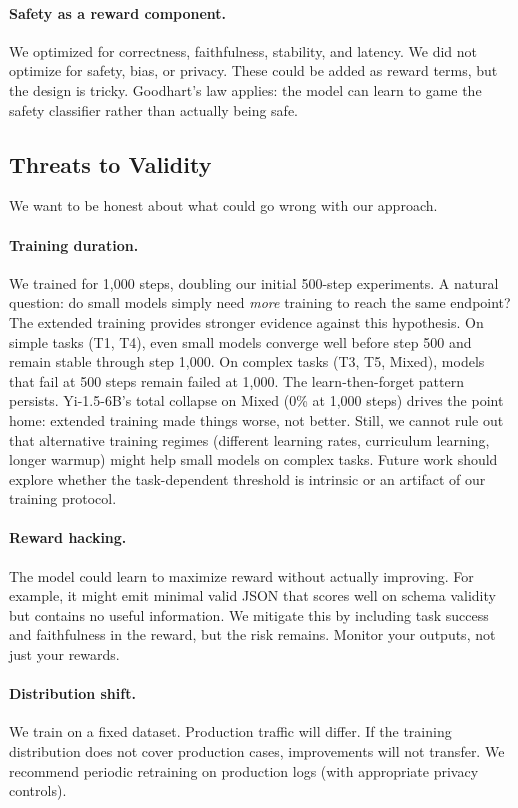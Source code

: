 \documentclass[11pt]{article}
\begin{document}
\paragraph{Safety as a reward component.}
We optimized for correctness, faithfulness, stability, and latency.
We did not optimize for safety, bias, or privacy.
These could be added as reward terms, but the design is tricky.  Goodhart's law applies: the model can learn to game the safety classifier rather than actually being safe.

\subsection{Threats to Validity}

We want to be honest about what could go wrong with our approach.

\paragraph{Training duration.}
We trained for 1{,}000 steps, doubling our initial 500-step experiments.
A natural question: do small models simply need \emph{more} training to reach the same endpoint?
The extended training provides stronger evidence against this hypothesis.
On simple tasks (T1, T4), even small models converge well before step 500 and remain stable through step 1{,}000.
On complex tasks (T3, T5, Mixed), models that fail at 500 steps remain failed at 1{,}000.  The learn-then-forget pattern persists.
Yi-1.5-6B's total collapse on Mixed (0\% at 1{,}000 steps) drives the point home: extended training made things worse, not better.
Still, we cannot rule out that alternative training regimes (different learning rates, curriculum learning, longer warmup) might help small models on complex tasks.
Future work should explore whether the task-dependent threshold is intrinsic or an artifact of our training protocol.

\paragraph{Reward hacking.}
The model could learn to maximize reward without actually improving.
For example, it might emit minimal valid JSON that scores well on schema validity but contains no useful information.
We mitigate this by including task success and faithfulness in the reward, but the risk remains.
Monitor your outputs, not just your rewards.

\paragraph{Distribution shift.}
We train on a fixed dataset.
Production traffic will differ.
If the training distribution does not cover production cases, improvements will not transfer.
We recommend periodic retraining on production logs (with appropriate privacy controls).
\end{document}
